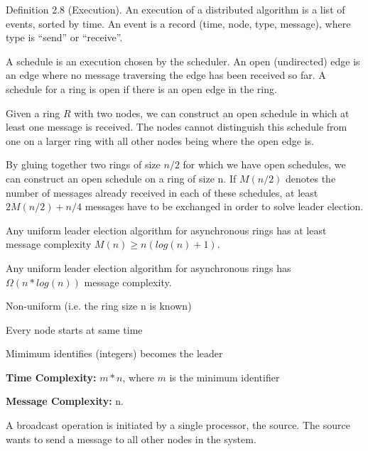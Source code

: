 {
	Definition 2.8 (Execution). An execution of a distributed algorithm is a list
	of events, sorted by time. An event is a record (time, node, type, message),
	where type is ``send'' or ``receive''.
}

{
	A schedule is an execution chosen by the scheduler. An open (undirected) edge
	is an edge where no message traversing the edge has been received so far. A
	schedule for a ring is open if there is an open edge in the ring.
}

{
	Given a ring $R$ with two nodes, we can construct an open schedule in which at
	least one message is received. The nodes cannot distinguish this schedule from
	one on a larger ring with all other nodes being where the open edge is. 
}

{
	By gluing together two rings of size $n/2$ for which we have open schedules, we
	can construct an open schedule on a ring of size n. If $M(n/2)$ denotes the
	number of messages already received in each of these schedules, at least
	$2M(n/2) + n/4$ messages have to be exchanged in order to solve leader
	election.
}

{
	Any uniform leader election algorithm for asynchronous rings has at least
	message complexity $M(n) \geq n (log(n) + 1)$.
}

{
	Any uniform leader election algorithm for asynchronous rings has
	$\Omega (n*log(n))$ message complexity.
}

{
	\begin{items}
		\item Non-uniform (i.e. the ring size n is known)
		\item Every node starts at same time
		\item Mimimum identifies (integers) becomes the leader
		\item {\bf Time Complexity:} $m*n$, where $m$ is the minimum identifier
		\item {\bf Message Complexity:} n. 
	\end{items}
}



{
	A broadcast operation is initiated by a single processor, the source. The
	source wants to send a message to all other nodes in the system. 
}

